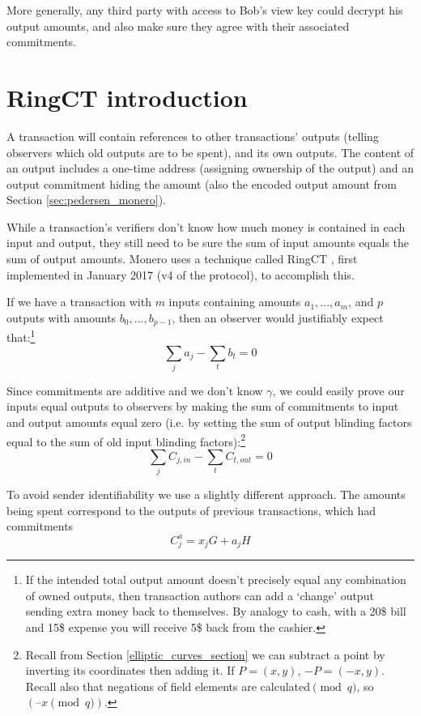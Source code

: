 More generally, any third party with access to Bob’s view key could decrypt his output amounts, and also make sure they agree with their associated commitments.



\section{RingCT introduction}
\label{sec:ringct-introduction}

A transaction will contain references to other transactions' outputs (telling observers which old outputs are to be spent), and its own outputs. The content of an output includes a one-time address (assigning ownership of the output) and an output commitment hiding the amount (also the encoded output amount from Section \ref{sec:pedersen_monero}).

While a transaction's verifiers don’t know how much money is contained in each input and output, they still need to be sure the sum of input amounts equals the sum of output amounts. Monero uses a technique called RingCT \cite{MRL-0005-ringct}, first implemented in January 2017 (v4 of the protocol), to accomplish this.

If we have a transaction with $m$ inputs containing amounts \(a_1, ..., a_m\), and $p$ outputs with amounts \(b_0, ..., b_{p-1}\), then an observer would justifiably expect that:\footnote{If the intended total output amount doesn't precisely equal any combination of owned outputs, then transaction authors can add a `change' output sending extra money back to themselves. By analogy to cash, with a 20\$ bill and 15\$ expense you will receive 5\$ back from the cashier.}\vspace{.175cm}
\[\sum_j a_j - \sum_t b_t = 0\]

Since commitments are additive and we don't know $\gamma$, we could easily prove our inputs equal outputs to observers by making the sum of commitments to input and output amounts equal zero (i.e. by setting the sum of output blinding factors equal to the sum of old input blinding factors):\footnote{Recall from Section \ref{elliptic_curves_section} we can subtract a point by inverting its coordinates then adding it. If $P = (x, y)$, $-P = (-x, y)$. Recall also that negations of field elements are calculated$\pmod q$, so $(–x \pmod q)$.}\vspace{.175cm}
\[\sum_{j}{C_{j, in}} - \sum_{t}{C_{t, out}} = 0\]

To avoid sender identifiability we use a slightly different approach. The amounts being spent correspond to the outputs of previous transactions, which had commitments\vspace{.175cm}
\[C^a_{j} = x_j G + a_j H\]

